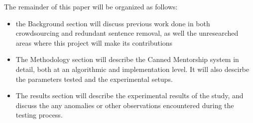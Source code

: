 The remainder of this paper will be organized as follows:
\begin{itemize}
	\item the Background section will discuss previous work done in both crowdsourcing and redundant sentence removal, as well the unresearched areas where this project will make its contributions
	
	\item The Methodology section will describe the Canned Mentorship system in detail, both at an algorithmic and implementation level. It will also descirbe the parameters tested and the experimental setups.
	
	\item The results section will describe the experimental results of the study, and discuss the any anomalies or other observations encountered during the testing process.
\end{itemize}